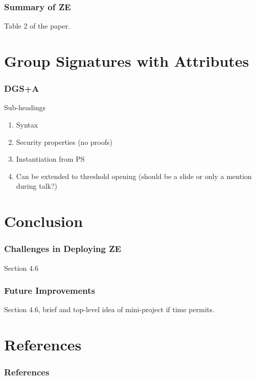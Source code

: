 \documentclass{beamer}
\begin{document}
    \begin{frame}
        \frametitle{Summary of ZE}
        Table 2 of the paper.
    \end{frame}

    \section{Group Signatures with Attributes}
    \begin{frame}
        \frametitle{DGS+A}
        Sub-headings
        \begin{enumerate}
            \item Syntax
            \item Security properties (no proofs)
            \item Instantiation from PS
            \item Can be extended to threshold opening (should be a slide or
            only a mention during talk?)
        \end{enumerate}
    \end{frame}

    \section{Conclusion}
    \begin{frame}
        \frametitle{Challenges in Deploying ZE}
        Section 4.6
    \end{frame}

    \begin{frame}
        \frametitle{Future Improvements}
        Section 4.6, brief and top-level idea of mini-project if time permits.
    \end{frame}

    \section{References}
    \begin{frame}[allowframebreaks]
        \frametitle{References}
        
    \end{frame}
\end{document}
